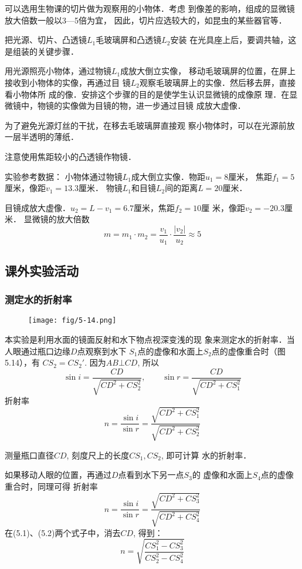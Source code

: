 可以选用生物课的切片做为观察用的小物体．考虑
到像差的影响，组成的显微镜放大倍数一般以3—5倍为宜，
因此，切片应选较大的，如昆虫的某些器官等．

把光源、切片、凸透镜$L_1$毛玻璃屏和凸透镜$L_2$安装
在光具座上后，要调共轴，这是组装的关键步骤．

用光源照亮小物体，通过物镜$L_1$成放大倒立实像，
移动毛玻璃屏的位置，在屏上接收到小物体的实像，再通过目
镜$L_2$观察毛玻璃屏上的实像．然后移去屏，直接看小物体所
成的像．安排这个步骤的目的是使学生认识显微镜的成像原
理．在显微镜中，物镜的实像做为目镜的物，进一步通过目镜
成放大虚像．

为了避免光源灯丝的干扰，在移去毛玻璃屏直接观
察小物体时，可以在光源前放一层半透明的薄纸．

注意使用焦距较小的凸透镜作物镜．

实验参考数据：
小物体通过物镜$L_1$成大倒立实像．物距$u_1=8$厘米，
焦距$f_1=5$厘米，像距$v_1=13.3$厘米．
物镜$L_1$和目镜$L_2$间的距离$L=20$厘米．

目镜成放大虚像．$u_2=L-v_1=6.7$厘米，焦距$f_2=10$厘
米，像距$v_2=-20.3$厘米．
显微镜的放大倍数$$m=m_1\cdot m_2=\frac{v_1}{u_1}\cdot \frac{|v_2|}{u_2}\approx 5$$

\subsection{课外实验活动}
\subsubsection{测定水的折射率}
\begin{figure}[htp]
    \centering
    \texttt{[image: fig/5-14.png]}
    \caption{}
\end{figure}

本实验是利用水面的镜面反射和水下物点视深变浅的现
象来测定水的折射率．当人眼通过瓶口边缘$D$点观察到水下
$S_1$点的虚像和水面上$S_2$点的虚像重合时（图5.14），有
$CS_2=CS_2'$.
因为$AB\bot CD$, 所以
\[\sin i=\frac{CD}{\sqrt{CD^2+CS_2^2}},\qquad \sin r=\frac{CD}{\sqrt{CD^2+CS_1^2}}\]
折射率
\begin{equation}
    n=\frac{\sin i}{\sin r}=\frac{\sqrt{CD^2+CS_1^2}}{\sqrt{CD^2+CS_2^2}}
\end{equation}

测量瓶口直径$CD$, 刻度尺上的长度$CS_1,CS_2$, 即可计算
水的折射率．

如果移动人眼的位置，再通过$D$点看到水下另一点$S_3$的
虚像和水面上$S_4$点的虚像重合时，同理可得
折射率
\begin{equation}
    n=\frac{\sin i}{\sin r}=\frac{\sqrt{CD^2+CS_3^2}}{\sqrt{CD^2+CS_4^2}}
\end{equation}
在(5.1)、(5.2)两个式子中，消去$CD$, 得到：
\[n=\sqrt{\frac{CS_1^2-CS_3^2}{CS_2^2-CS_4^2}}\]


